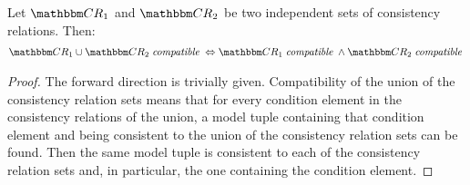 \begin{theorem} \label{theorem:independencecompatibility}
    Let $\consistencyrelationset{CR}_{1}$ and $\consistencyrelationset{CR}_{2}$ be two independent sets of consistency relations. Then:
    \begin{align*}
        \consistencyrelationset{CR}_{1} \cup \consistencyrelationset{CR}_{2} \compatiblemath \equivalent \consistencyrelationset{CR}_{1} \compatiblemath \land \consistencyrelationset{CR}_{2} \compatiblemath
    \end{align*}
\end{theorem}
\begin{proof}
    The forward direction is trivially given. 
    Compatibility of the union of the consistency relation sets means that for every condition element in the consistency relations of the union, a model tuple containing that condition element and being consistent to the union of the consistency relation sets can be found. Then the same model tuple is consistent to each of the consistency relation sets and, in particular, the one containing the condition element.


\end{proof}
